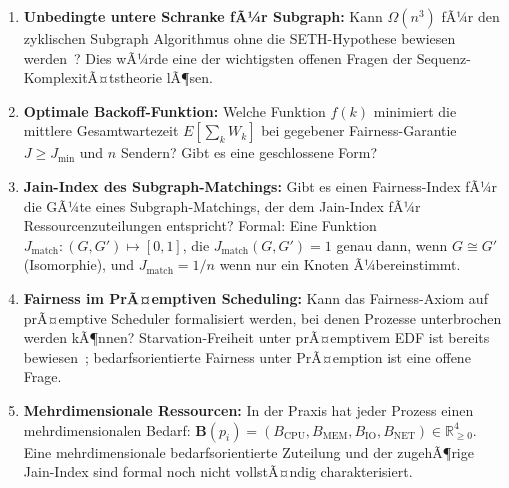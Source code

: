 ﻿\documentclass[a4paper,12pt]{article}
\theoremstyle{definition}
\begin{document}
\begin{enumerate}
  \item \textbf{Unbedingte untere Schranke fÃ¼r Subgraph:}
        Kann $\Omega(n^3)$ fÃ¼r den zyklischen
        Subgraph Algorithmus ohne die SETH-Hypothese
        bewiesen werden~\cite{abboud2015tight}?
        Dies wÃ¼rde eine der wichtigsten offenen Fragen
        der Sequenz-KomplexitÃ¤tstheorie lÃ¶sen.

  \item \textbf{Optimale Backoff-Funktion:}
        Welche Funktion $f(k)$ minimiert die mittlere
        Gesamtwartezeit $E[\sum_k W_k]$ bei gegebener
        Fairness-Garantie $J \geq J_{\min}$ und
        $n$ Sendern? Gibt es eine geschlossene Form?

  \item \textbf{Jain-Index des Subgraph-Matchings:}
        Gibt es einen Fairness-Index fÃ¼r die
        GÃ¼te eines Subgraph-Matchings, der dem
        Jain-Index fÃ¼r Ressourcenzuteilungen entspricht?
        Formal: Eine Funktion
        $J_{\mathrm{match}}: (G, G') \mapsto [0,1]$,
        die $J_{\mathrm{match}}(G, G') = 1$ genau dann,
        wenn $G \cong G'$ (Isomorphie), und
        $J_{\mathrm{match}} = 1/n$ wenn nur ein
        Knoten Ã¼bereinstimmt.

  \item \textbf{Fairness im PrÃ¤emptiven Scheduling:}
        Kann das Fairness-Axiom auf prÃ¤emptive
        Scheduler formalisiert werden, bei denen
        Prozesse unterbrochen werden kÃ¶nnen?
        Starvation-Freiheit unter prÃ¤emptivem
        EDF ist bereits bewiesen~\cite{liu1973scheduling};
        bedarfsorientierte Fairness unter PrÃ¤emption
        ist eine offene Frage.

  \item \textbf{Mehrdimensionale Ressourcen:}
        In der Praxis hat jeder Prozess einen
        mehrdimensionalen Bedarf:
        $\mathbf{B}(p_i) = (B_{\mathrm{CPU}},
        B_{\mathrm{MEM}}, B_{\mathrm{IO}},
        B_{\mathrm{NET}}) \in \mathbb{R}^4_{\geq 0}$.
        Eine mehrdimensionale bedarfsorientierte
        Zuteilung und der zugehÃ¶rige Jain-Index
        sind formal noch nicht vollstÃ¤ndig
        charakterisiert.
\end{enumerate}
\end{document}
